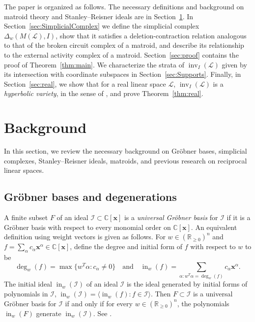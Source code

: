 \documentclass[ALCO,ThmDefs,Unicode,epreuves]{cedram}
\newcommand{\R}{\mathbb{R}}
\newcommand{\Cbb}{\mathbb{C}}
\newcommand{\I}{\mathcal{I}}
\newcommand{\cL}{\mathcal{L}}
\newcommand{\x}{\mathbf{x}}
\DeclareMathOperator{\In}{in}
\DeclareMathOperator{\inv}{inv}
\begin{document}
The paper is organized as follows. The necessary definitions and background on matroid theory and Stanley--Reisner ideals 
are in Section~\ref{Background}. In Section~\ref{sec:SimplicialComplex} we define the simplicial complex $\Delta_w(M(\cL), I)$,
show that it satisfies a deletion-contraction relation analogous to that of the broken circuit complex of a matroid, and describe its relationship
to the external activity complex of a matroid. Section~\ref{sec:proof} 
contains the proof of Theorem~\ref{thm:main}. We characterize the strata of $\inv_I(\cL)$ given by its intersection with coordinate subspaces in Section~\ref{sec:Supports}.
Finally, in Section~\ref{sec:real}, we show that for a real linear space $\cL$, $\inv_I(\cL)$ is a \emph{hyperbolic variety}, in the sense of \cite{KV,SV}, 
and prove Theorem~\ref{thm:real}. 


\section{Background}\label{Background}

In this section, we review the necessary background on Gr\"obner bases, simplicial complexes, Stanley--Reisner ideals, matroids, and 
previous research on reciprocal linear spaces. 

\subsection{Gr\"obner bases and degenerations} \label{subsec:Grobner}

A finite subset $F$ of an ideal $\I \subset \Cbb[\x]$ is a \emph{universal Gr\"obner basis} for $\I$ 
if it is a Gr\"obner basis with respect to every monomial order on $\Cbb[\x]$. 
An equivalent definition using weight vectors is given as follows. For $w\in (\R_{\geq 0})^n$ and $f = \sum_\alpha c_{\alpha} \x^{\alpha} \in \Cbb[\x]$, 
define the degree and initial form of $f$ with respect to $w$ to be 
\[
\deg_w(f) = \max\{w^T\alpha : c_{\alpha}\neq 0\} \quad \text{and} \quad
\In_w(f) = \sum_{\alpha: w^T\alpha = \deg_w(f) } c_{\alpha} \x^{\alpha}. \]
The initial ideal $\In_w(\I)$ of an ideal $\I$ is the ideal generated by initial forms of polynomials in $\I$, \ie $\In_w(\I) = \langle \In_w(f) : f\in \I\rangle$. 
Then $F\subset \I$ is a universal Gr\"obner basis for $\I$ if and only if for every $w\in (\R_{\geq 0})^n$, the polynomials $\In_w(F)$ generate $\In_w(\I)$. 
See \cite[Chapter~1]{GrobnerPolytope}. 
\end{document}

